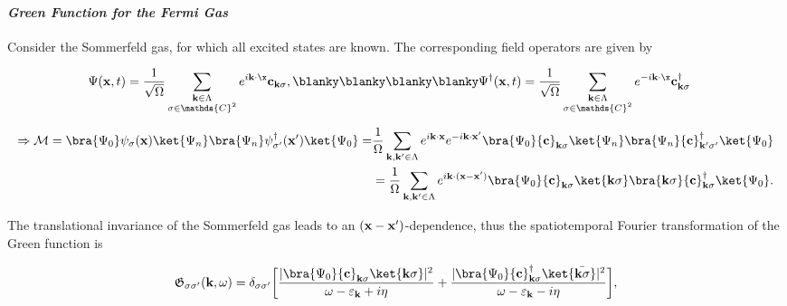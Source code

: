 \paragraph{\textit{Green Function for the Fermi Gas}}

Consider the Sommerfeld gas, for which all excited states 
are known. The corresponding field operators are given by

\begin{equation} \begin{split}
    &\Psi({\bf x}, t) = \frac{1}{\sqrt{\Omega}} \sum_{\substack{{\bf k} \in \Lambda \\
    \sigma \in \mathds{C}^2}} e^{i {\bf k} \cdot {\x}} {\bf c}_{{\bf k} \sigma}, \blanky \blanky \blanky \blanky 
    \Psi^\dagger({\bf x}, t) = \frac{1}{\sqrt{\Omega}} \sum_{\substack{{\bf k} \in \Lambda \\
    \sigma \in \mathds{C}^2}} e^{-i {\bf k} \cdot {\x}} {\bf c}_{{\bf k} \sigma}^\dagger
    \end{split}
\end{equation}

\begin{equation}
    \begin{split}
    \Rightarrow \mathcal{M} = \bra{\Psi_0} \psi_{\sigma}({\bf x}) \ket{\Psi_n} \bra{\Psi_n} \psi_{\sigma'}^\dagger({\bf x}') \ket{\Psi_0} = & \frac{1}{\Omega} \sum_{{\bf k}, {\bf k}' \in \Lambda} e^{i {\bf k} \cdot {\bf x}} e^{-i {\bf k} \cdot {\bf x}'} \bra{\Psi_0} {{\bf c}}_{{\bf k} \sigma} \ket{\Psi_n} \bra{\Psi_n} {{\bf c}}_{{\bf k}' \sigma'}^\dagger \ket{\Psi_0} \\
    & = \frac{1}{\Omega} \sum_{{\bf k}, {\bf k}' \in \Lambda} e^{i {\bf k} \cdot ({\bf x}-{\bf x}')} \bra{\Psi_0} {{\bf c}}_{{\bf k} \sigma} \ket{{\bf k} \sigma} \bra{{\bf k} \sigma} {{\bf c}}_{{\bf k} \sigma}^\dagger \ket{\Psi_0}.
    \end{split}
\end{equation}

The translational invariance of the Sommerfeld gas leads to an $({\bf x}-{\bf x}')$-dependence, thus the spatiotemporal Fourier transformation of the Green function is 

\begin{equation}
    \mathfrak{G}_{\sigma \sigma'} ({\bf k}, \omega) = \delta_{\sigma \sigma'} \bigg[\frac{|\bra{\Psi_0} {{\bf c}}_{{\bf k} \sigma} \ket{{\bf k} \sigma}|^2}{\omega - \varepsilon_{\bf k} + i\eta} + \frac{|\bra{\Psi_0} {{\bf c}}^\dagger_{{\bf k} \sigma} \ket{\bar{{\bf k} \sigma}}|^2}{\omega - \varepsilon_{\bf k} - i\eta}\bigg],
\end{equation}

